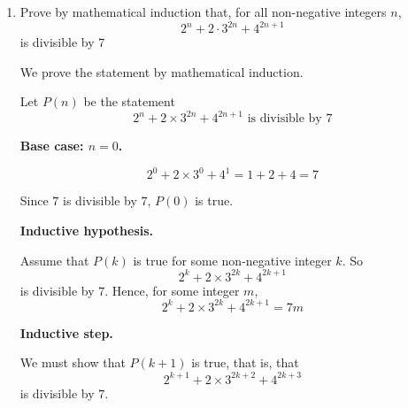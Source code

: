 \documentclass[leqno]{article}
\newcommand{\questionitem}{%
  \item\phantomsection
  \addcontentsline{toc}{section}{Question \number\value{enumi}}%
}
\begin{document}
\begin{enumerate}[
  label=\textbf{\arabic*.},
  leftmargin=*,
  topsep=0pt,
  partopsep=0pt,
  parsep=0pt
]
\begin{tcolorbox}[colback=white, colframe=scarlet, title={\textbf{Solution}}, breakable, grow to left by=6mm, grow to right by=10mm]
\begin{enumerate}[label=\textbf{(\alph*)}]
  Since \(k\geq 1\), \(4^{k-1}\) is an integer, so this whole difference is a multiple of \(12\).

  Therefore
  \begin{align*}
  13^{k+1}+3\cdot 4^{k+1}+11
  &= \left(13^k+3\cdot 4^k+11\right)
   + \left[\left(13^{k+1}+3\cdot 4^{k+1}+11\right)-\left(13^k+3\cdot 4^k+11\right)\right] \\
  &= 12m + 12\cdot 13^k + 12\left(3\cdot 4^{k-1}\right) \\
  &= 12\left(m+13^k+3\cdot 4^{k-1}\right)
  \end{align*}

  So \(13^{k+1}+3\cdot 4^{k+1}+11\) is divisible by \(12\). Hence \(P(k+1)\) is true.

  Since \(P(1)\) is true and \(P(k)\Rightarrow P(k+1)\), it follows by mathematical induction that
  \[
  13^n+3\cdot 4^n+11
  \]
  is divisible by \(12\) for all \(n\in\mathbb{Z}^+\).

\end{enumerate}
\end{tcolorbox}


\newpage

\questionitem

Prove by mathematical induction that, for all non-negative integers $n$,
\[
2^n+2\cdot 3^{2n}+4^{2n+1}
\]
is divisible by $7$ 

\vspace*{30pt}

\begin{tcolorbox}[colback=white, colframe=scarlet, title={\textbf{Solution}}, breakable, grow to left by=6mm, grow to right by=10mm]
We prove the statement by mathematical induction.

Let \(P(n)\) be the statement
\[
2^n + 2\times 3^{2n} + 4^{2n+1} \text{ is divisible by } 7
\]

\textbf{Base case: \(n=0\).}

\[
2^0 + 2\times 3^0 + 4^1 = 1+2+4=7
\]

Since \(7\) is divisible by \(7\), \(P(0)\) is true.

\textbf{Inductive hypothesis.}

Assume that \(P(k)\) is true for some non-negative integer \(k\).  
So
\[
2^k + 2\times 3^{2k} + 4^{2k+1}
\]
is divisible by \(7\). Hence, for some integer \(m\),
\[
2^k + 2\times 3^{2k} + 4^{2k+1} = 7m
\]

\textbf{Inductive step.}

We must show that \(P(k+1)\) is true, that is, that
\[
2^{k+1} + 2\times 3^{2k+2} + 4^{2k+3}
\]
is divisible by \(7\).


\end{tcolorbox}
\end{enumerate}
\end{document}

